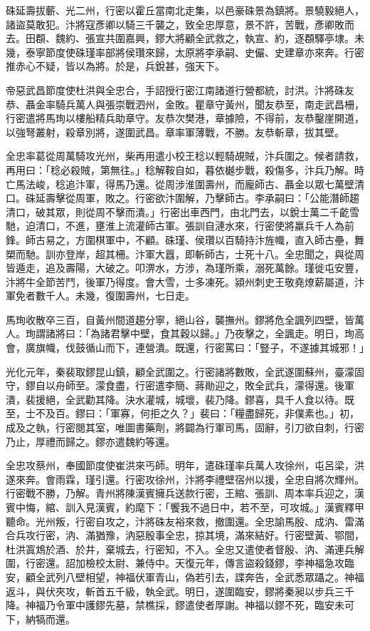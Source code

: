 \begin{pinyinscope}
 硃延壽拔蘄、光二州，行密以霍丘當南北走集，以邑豪硃景為鎮將。景驍毅絕人，諸盜莫敢犯。汴將寇彥卿以騎三千襲之，致全忠厚意，景不許，苦戰，彥卿敗而去。田頵、魏約、張宣共圍嘉興，鏐大將顧全武救之，執宣、約，逐頵驛亭埭。未幾，泰寧節度使硃瑾率部將侯瓚來歸，太原將李承嗣、史儼、史建章亦來奔。行密推赤心不疑，皆以為將。於是，兵銳甚，強天下。



 帝惡武昌節度使杜洪與全忠合，手詔授行密江南諸道行營都統，討洪。汴將硃友恭、聶金率騎兵萬人與張崇戰泗州，金敗。瞿章守黃州，聞友恭至，南走武昌柵，行密遣將馬珣以樓船精兵助章守。友恭次樊港，章據險，不得前，友恭鑿崖開道，以強弩叢射，殺章別將，遂圍武昌。章率軍薄戰，不勝。友恭斬章，拔其壁。



 全忠率葛從周萬騎攻光州，柴再用遣小校王稔以輕騎覘賊，汴兵圍之。候者請救，再用曰：「稔必殺賊，第無往。」稔解鞍自如，暮依樾步戰，殺傷多，汴兵乃解。時亡馬法峻，稔追汴軍，得馬乃還。從周涉淮圍壽州，而龐師古、聶金以眾七萬壁清口。硃延壽擊從周軍，敗之。行密欲汴圍解，乃擊師古。李承嗣曰：「公能潛師趨清口，破其眾，則從周不擊而潰。」行密出車西門，由北門去，以銳士萬二千齕雪馳，迫清口，不進，壅淮上流灌師古軍。張訓自漣水來，行密使將羸兵千人為前鋒。師古易之，方圍棋軍中，不顧。硃瑾、侯瓚以百騎持汴旌幟，直入師古壘，舞槊而馳。訓亦登岸，超其柵。汴軍大囂，即斬師古，士死十八。全忠聞之，與從周皆遁走，追及壽陽，大破之。叩淠水，方涉，為瑾所乘，溺死萬餘。瑾徙屯安豐，汴將牛全節苦鬥，後軍乃得度。會大雪，士多凍死。潁州刺史王敬堯燎薪屬道，汴軍免者數千人。未幾，復圍壽州，七日走。



 馬珣收散卒三百，自黃州間道趨分寧，絕山谷，襲撫州。鏐將危全諷列四壁，皆萬人。珣謂諸將曰：「為諸君擊中壁，食其穀以歸。」乃夜擊之，全諷走。明日，珣高會，廣旗幟，伐鼓循山而下，連營潰。既還，行密罵曰：「豎子，不遂據其城邪！」



 光化元年，秦裴取鏐昆山鎮，顧全武圍之。行密諸將數敗，全武遂圍蘇州，臺濛固守，鏐自以舟師至。濛食盡，行密遣李簡、蔣勛迎之，敗全武兵，濛得還。後軍潰，裴援絕，全武勸其降。決水灌城，城壞，裴乃降。鏐喜，具千人食以待。既至，士不及百。鏐曰：「軍寡，何拒之久？」裴曰：「糧盡歸死，非僕素也。」初，成及之執，行密閱其室，唯圖書藥劑，將闢為行軍司馬，固辭，引刀欲自刺，行密乃止，厚禮而歸之。鏐亦遣魏約等還。



 全忠攻蔡州，奉國節度使崔洪來丐師。明年，遣硃瑾率兵萬人攻徐州，屯呂梁，洪遂來奔。會雨霖，瑾引還。行密攻徐州，汴將李禮壁宿州以援，全忠自將次輝州。行密戰不勝，乃解。青州將陳漢賓擁兵送款行密，王綰、張訓、周本率兵迎之，漢賓中悔，綰、訓入見漢賓，約麾下：「饗我不過日中，若不至，可攻城。」漢賓釋甲聽命。光州叛，行密自攻之，汴將硃友裕來救，撤圍還。全忠諭馬殷、成汭、雷滿合兵攻行密，汭、滿猶豫，汭惡殷事全忠，掠其境，滿來結好。行密壁黃、鄂間，杜洪寘鴆於酒、於井，棄城去，行密知，不入。全忠又遣使者督殷、汭、滿連兵解圍，行密還。詔加檢校太尉、兼侍中。天復元年，傳言盜殺錢鏐，李神福急攻臨安，顧全武列八壁相望，神福伏軍青山，偽若引去，諜奔告，全武悉眾躡之。神福返斗，與伏夾攻，斬首五千級，執全武。明日，遂圍臨安，鏐將秦昶以步兵三千降。神福乃令軍中護鏐先墓，禁樵採，鏐遣使者厚謝。神福以鏐不死，臨安未可下，納犒而還。




\end{pinyinscope}
